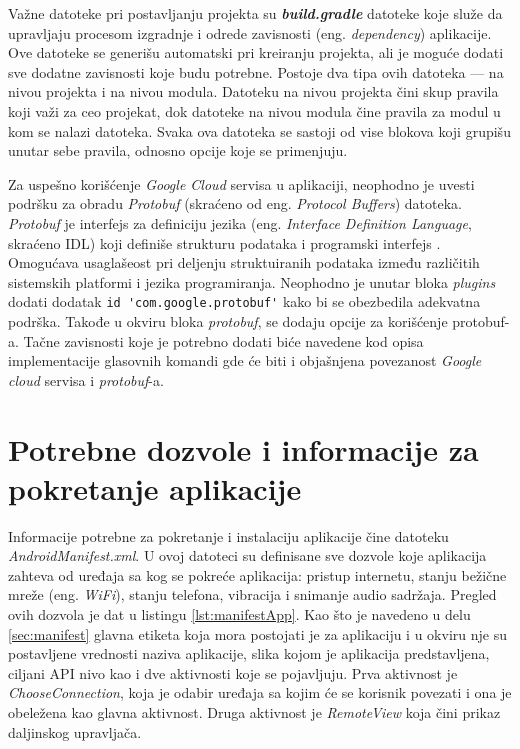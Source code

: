 \documentclass[implementacija.tex]{subfiles}
\begin{document}
Važne datoteke pri postavljanju projekta su \textbf{\textit{build.gradle}} datoteke koje služe da  upravljaju procesom izgradnje i odrede zavisnosti (eng. \textit{dependency}) aplikacije. Ove datoteke se generišu automatski pri kreiranju projekta, ali je moguće dodati sve dodatne zavisnosti koje budu potrebne. Postoje dva tipa ovih datoteka --- na nivou projekta i na nivou modula. Datoteku na nivou projekta čini skup pravila koji važi za ceo projekat, dok datoteke na nivou modula čine pravila za modul u kom se nalazi datoteka. Svaka ova datoteka se sastoji od vise blokova koji grupišu unutar sebe pravila, odnosno opcije koje se primenjuju.

Za uspešno korišćenje \textit{Google Cloud} servisa u aplikaciji, neophodno je uvesti podršku za obradu \textit{Protobuf} (skraćeno od eng. \textit{Protocol Buffers}) datoteka. \textit{Protobuf} je interfejs za definiciju jezika (eng. \textit{Interface Definition Language}, skraćeno IDL) koji definiše strukturu podataka i programski interfejs \cite{sajt:protobuf}. Omogućava usaglašeost pri deljenju struktuiranih podataka između različitih sistemskih platformi i jezika programiranja. Neophodno je unutar bloka \textit{plugins} dodati dodatak \verb|id 'com.google.protobuf'| kako bi se obezbedila adekvatna podrška. Takođe u okviru bloka \textit{protobuf}, se dodaju opcije za korišćenje protobuf-a. Tačne zavisnosti koje je potrebno dodati biće navedene kod opisa implementacije glasovnih komandi gde će biti i objašnjena povezanost \textit{Google cloud} servisa i \textit{protobuf}-a.

\section{Potrebne dozvole i informacije za pokretanje aplikacije}

Informacije potrebne za pokretanje i instalaciju aplikacije čine datoteku \textit{AndroidManifest.xml}. U ovoj datoteci su definisane sve dozvole koje aplikacija zahteva od uređaja sa kog se pokreće aplikacija: pristup internetu, stanju bežične mreže (eng. \textit{WiFi}), stanju telefona, vibracija i  snimanje audio sadržaja. Pregled ovih dozvola je dat u listingu \ref{lst:manifestApp}. Kao što je navedeno u delu \ref{sec:manifest} glavna etiketa koja mora postojati je za aplikaciju i u okviru nje su postavljene vrednosti naziva aplikacije, slika kojom je aplikacija predstavljena, ciljani API nivo kao i dve aktivnosti koje se pojavljuju. Prva aktivnost je \textit{ChooseConnection}, koja je odabir uređaja sa kojim će se korisnik povezati i ona je obeležena kao glavna aktivnost. Druga aktivnost je \textit{RemoteView} koja čini prikaz daljinskog upravljača. 
\end{document}
